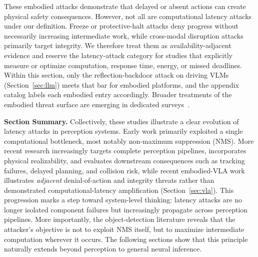 \documentclass[acmsmall,screen,review,nonacm]{acmart}
\begin{document}
These embodied attacks demonstrate that delayed or absent actions can create physical safety consequences. However, not all are computational latency attacks under our definition. Freeze or protective-halt attacks deny progress without necessarily increasing intermediate work, while cross-modal disruption attacks primarily target integrity. We therefore treat them as availability-adjacent evidence and reserve the latency-attack category for studies that explicitly measure or optimize computation, response time, energy, or missed deadlines. Within this section, only the reflection-backdoor attack on driving VLMs~\cite{liu2025vlmbackdoor} (Section~\ref{sec:llm}) meets that bar for embodied platforms, and the appendix catalog labels each embodied entry accordingly. Broader treatments of the embodied threat surface are emerging in dedicated surveys~\cite{xing2025embodiedsurvey}.


\textbf{Section Summary.} Collectively, these studies illustrate a clear evolution of latency attacks in perception systems. Early work primarily exploited a single computational bottleneck, most notably non-maximum suppression (NMS). More recent research increasingly targets complete perception pipelines, incorporates physical realizability, and evaluates downstream consequences such as tracking failures, delayed planning, and collision risk, while recent embodied-VLA work illustrates \emph{adjacent} denial-of-action and integrity threats rather than demonstrated computational-latency amplification (Section~\ref{sec:vla}). This progression marks a step toward system-level thinking: latency attacks are no longer isolated component failures but increasingly propagate across perception pipelines. More importantly, the object-detection literature reveals that the attacker's objective is not to exploit NMS itself, but to maximize intermediate computation wherever it occurs. The following sections show that this principle naturally extends beyond perception to general neural inference.
\end{document}
